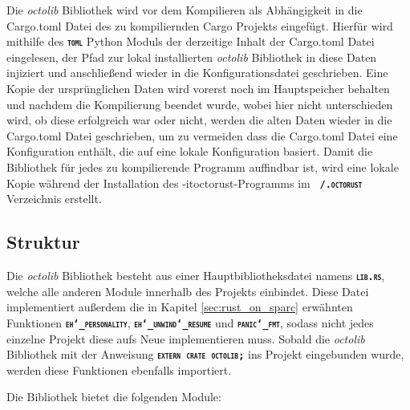Die \textit{octolib} Bibliothek wird vor dem Kompilieren als Abhängigkeit in die Cargo.toml Datei des
zu kompiliernden Cargo Projekts eingefügt.
Hierfür wird mithilfe des \texttt{\textsc{\textbf{toml}}} Python Moduls der derzeitige Inhalt der Cargo.toml Datei
eingelesen, der Pfad zur lokal installierten \textit{octolib} Bibliothek in diese Daten injiziert und anschließend 
wieder in die Konfigurationsdatei geschrieben.
Eine Kopie der ursprünglichen Daten wird vorerst noch im Hauptspeicher behalten und
nachdem die Kompilierung beendet wurde, wobei hier nicht unterschieden wird, ob diese erfolgreich war oder nicht,
werden die alten Daten wieder in die Cargo.toml Datei geschrieben,
um zu vermeiden dass die Cargo.toml Datei eine Konfiguration enthält, die auf eine lokale Konfiguration basiert.
Damit die Bibliothek für jedes zu kompilierende Programm auffindbar ist,
wird eine lokale Kopie während der Installation des \text-it{octorust}-Programms im
\texttt{\textsc{\textbf{~/.octorust}}} Verzeichnis erstellt.

\subsection{Struktur}

Die \textit{octolib} Bibliothek besteht aus einer Hauptbibliotheksdatei namens \texttt{\textsc{\textbf{lib.rs}}},
welche alle anderen Module innerhalb des Projekts einbindet. Diese
Datei implementiert außerdem die in Kapitel \ref{sec:rust_on_sparc} erwähnten Funktionen
\texttt{\textsc{\textbf{eh\char`_personality}}}, \texttt{\textsc{\textbf{eh\char`_unwind\char`_resume}}} und
\texttt{\textsc{\textbf{panic\char`_fmt}}}, sodass nicht jedes einzelne Projekt diese aufs Neue implementieren muss. 
Sobald die \textit{octolib} Bibliothek mit der Anweisung \texttt{\textsc{\textbf{extern crate octolib;}}}
ins Projekt eingebunden wurde, werden diese Funktionen ebenfalls importiert.

Die Bibliothek bietet die folgenden Module:

